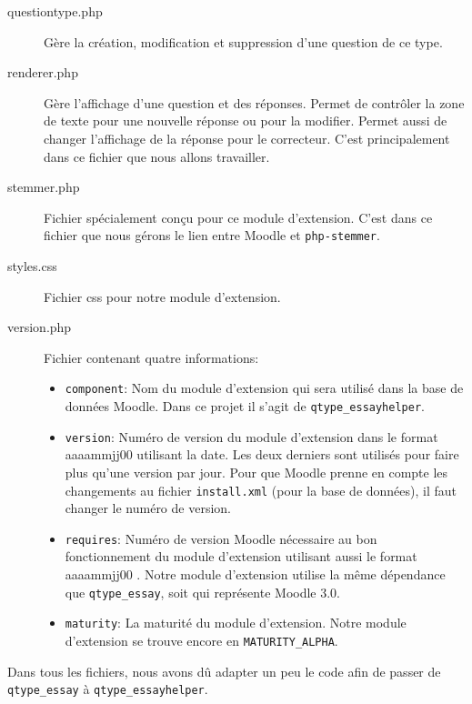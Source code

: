 \begin{description}
 \item[questiontype.php]
 
 G\`ere la cr\'eation, modification et suppression d'une question de ce type.
 
 \item[renderer.php]
 
 G\`ere l'affichage d'une question et des r\'eponses.
 Permet de contr\^oler la zone de texte pour une nouvelle r\'eponse ou pour la modifier.
 Permet aussi de changer l'affichage de la r\'eponse pour le correcteur.
 C'est principalement dans ce fichier que nous allons travailler.
 
 \item[stemmer.php]
 
 Fichier sp\'ecialement con\c{c}u pour ce module d'extension.
 C'est dans ce fichier que nous g\'erons le lien entre Moodle et \texttt{php-stemmer}.
 
 \item[styles.css]
 
 Fichier css pour notre module d'extension.
 
 \item[version.php]
 
 Fichier contenant quatre informations:
 \begin{itemize}
   \item \texttt{component}: 
   Nom du module d'extension qui sera utilis\'e dans la base de donn\'ees Moodle.
   Dans ce projet il s'agit de \texttt{qtype\_essayhelper}.
   
   \item \texttt{version}:
   Num\'ero de version du module d'extension dans le format \og aaaammjj00 \fg{} utilisant la date.
   Les deux derniers  \fg{} sont utilis\'es pour faire plus qu'une version par jour.
   Pour que Moodle prenne en compte les changements au fichier \texttt{install.xml} (pour la base de donn\'ees), il faut changer le num\'ero de version.
   
   \item \texttt{requires}:
   Num\'ero de version Moodle n\'ecessaire au bon fonctionnement du module d'extension utilisant aussi le format \og aaaammjj00 \fg{}.
   Notre module d'extension utilise la m\^eme d\'ependance que \texttt{qtype\_essay}, soit  \fg{} qui repr\'esente Moodle 3.0.
   
   \item \texttt{maturity}:
   La maturit\'e du module d'extension.
   Notre module d'extension se trouve encore en \texttt{MATURITY\_ALPHA}.
 \end{itemize}
\end{description}
Dans tous les fichiers, nous avons d\^u adapter un peu le code afin de passer de \texttt{qtype\_essay} \`a \texttt{qtype\_essayhelper}.
